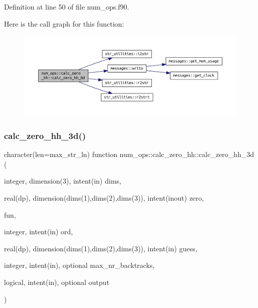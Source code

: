 Definition at line 50 of file num\+\_\+ops.\+f90.

Here is the call graph for this function\+:\nopagebreak
\begin{figure}[H]
\begin{center}
\leavevmode
\includegraphics[width=350pt]{interfacenum__ops_1_1calc__zero__hh_a6330f69d337ac43c8a529448f0f7048c_cgraph}
\end{center}
\end{figure}
\mbox{\label{interfacenum__ops_1_1calc__zero__hh_aa02df32d89ed7f87f0876756e9f3c7df}} 
\subsubsection{\texorpdfstring{calc\+\_\+zero\+\_\+hh\+\_\+3d()}{calc\_zero\_hh\_3d()}}
{\footnotesize\ttfamily character(len=max\+\_\+str\+\_\+ln) function num\+\_\+ops\+::calc\+\_\+zero\+\_\+hh\+::calc\+\_\+zero\+\_\+hh\+\_\+3d (\begin{DoxyParamCaption}\item[{integer, dimension(3), intent(in)}]{dims,  }\item[{real(dp), dimension(dims(1),dims(2),dims(3)), intent(inout)}]{zero,  }\item[{}]{fun,  }\item[{integer, intent(in)}]{ord,  }\item[{real(dp), dimension(dims(1),dims(2),dims(3)), intent(in)}]{guess,  }\item[{integer, intent(in), optional}]{max\+\_\+nr\+\_\+backtracks,  }\item[{logical, intent(in), optional}]{output }\end{DoxyParamCaption})}



